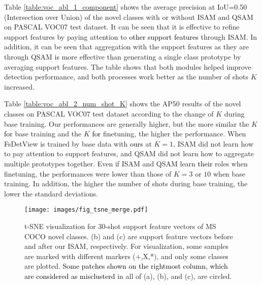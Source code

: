 \documentclass[10pt,twocolumn,letterpaper]{article}
\newcommand{\nj}[1]{\textcolor{black}{#1}}
\begin{document}
\vspace{+0.15cm}
\quad 
Table \ref{table:voc_abl_1_component} shows the average precision at IoU=0.50 (Intersection over Union) of the novel classes with or without ISAM and QSAM on PASCAL VOC07 test dataset. It can be seen that it is effective to refine support features by paying attention to \nj{other support features} through ISAM. In addition, it can be seen that aggregation with the support features as they are through QSAM is more effective than generating a single class prototype by averaging support features. The table shows that both modules helped improve detection performance, and both processes work better as the number of shots $K$ increased.

\vspace{+0.15cm}
\noindent{}{\bf The number of \nj{shots} $K$ during base training}\quad Table \ref{table:voc_abl_2_num_shot_K} shows the AP50 results of the novel classes on PASCAL VOC07 test dataset according to the change of $K$ during base training. Our performances are generally higher, but the more similar the $K$ \nj{for} base training and the $K$ \nj{for} finetuning, the higher the performance. When FsDetView is trained by base data with \nj{ours} at $K=1$, ISAM did not learn how to pay attention to support features, and QSAM did not learn how to aggregate multiple prototypes together. Even if ISAM and QSAM learn \nj{their} roles when finetuning, the performances were lower than those of $K={3}$ or $10$ when base training. In addition, the higher the number of shots during base training, the lower the standard deviations.







\begin{figure*}[!t]
\centering
\texttt{[image: images/fig\_tsne\_merge.pdf]}
\vspace{-0.9cm}
\caption{t-SNE visualization for 30-shot support feature vectors of MS COCO novel classes. (b) and (c) are support feature vectors before and after our ISAM, respectively. For visualization, some samples are marked with different markers (+,X,*), and only some classes are plotted. \nj{Some patches shown on the rightmost column, which are considered as misclusterd} in all of (a), (b), and (c), are circled.}
\label{fig:tsne_supp_attn}
\end{figure*}
\end{document}
